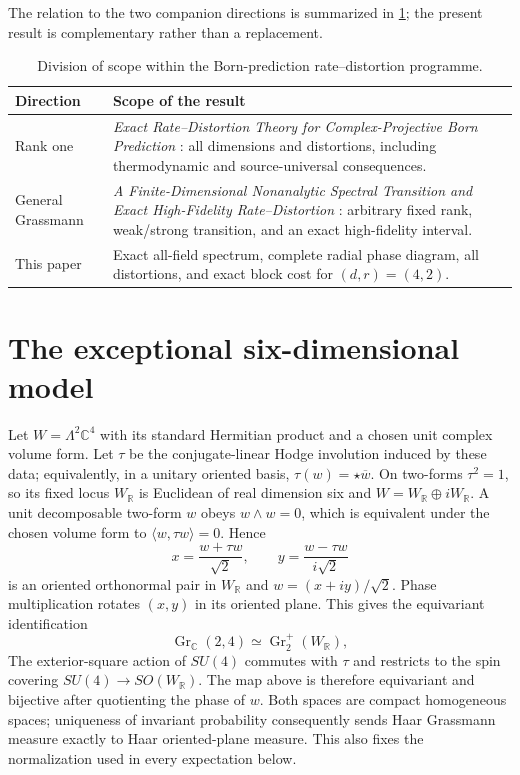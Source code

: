 \documentclass[11pt,a4paper]{article}
\newcommand{\Gr}{\operatorname{Gr}_{\mathbb C}}
\begin{document}
The relation to the two companion directions is summarized in \cref{tab:lineage}; the present result is complementary rather than a replacement.
\begin{table}[h]
\centering
\small
\begin{tabular}{@{}p{}p{}@{}}
\toprule
Direction & Scope of the result \\
\midrule
Rank one & \emph{Exact Rate--Distortion Theory for Complex-Projective Born Prediction} \cite{ErikssonProjectiveRDF2026}: all dimensions and distortions, including thermodynamic and source-universal consequences. \\
General Grassmann & \emph{A Finite-Dimensional Nonanalytic Spectral Transition and Exact High-Fidelity Rate--Distortion} \cite{ErikssonGrassmannRDF2026}: arbitrary fixed rank, weak/strong transition, and an exact high-fidelity interval. \\
This paper & Exact all-field spectrum, complete radial phase diagram, all distortions, and exact block cost for $(d,r)=(4,2)$. \\
\bottomrule
\end{tabular}
\caption{Division of scope within the Born-prediction rate--distortion programme.}
\label{tab:lineage}
\end{table}

\section{The exceptional six-dimensional model}

Let $W=\Lambda^2\mathbb C^4$ with its standard Hermitian product and a chosen unit complex volume form.  Let $\tau$ be the conjugate-linear Hodge involution induced by these data; equivalently, in a unitary oriented basis, $\tau(w)=\star\overline w$.  On two-forms $\tau^2=1$, so its fixed locus $W_{\mathbb R}$ is Euclidean of real dimension six and $W=W_{\mathbb R}\oplus iW_{\mathbb R}$.  A unit decomposable two-form $w$ obeys $w\wedge w=0$, which is equivalent under the chosen volume form to $\langle w,\tau w\rangle=0$.  Hence
\[
x=\frac{w+\tau w}{\sqrt2},\qquad y=\frac{w-\tau w}{i\sqrt2}
\]
is an oriented orthonormal pair in $W_{\mathbb R}$ and $w=(x+iy)/\sqrt2$.  Phase multiplication rotates $(x,y)$ in its oriented plane.  This gives the equivariant identification
\[
\Gr(2,4)\simeq\operatorname{Gr}_2^+(W_{\mathbb R}),
\]
The exterior-square action of $SU(4)$ commutes with $\tau$ and restricts to the spin covering $SU(4)\to SO(W_{\mathbb R})$.  The map above is therefore equivariant and bijective after quotienting the phase of $w$.  Both spaces are compact homogeneous spaces; uniqueness of invariant probability consequently sends Haar Grassmann measure exactly to Haar oriented-plane measure.  This also fixes the normalization used in every expectation below.
\end{document}
